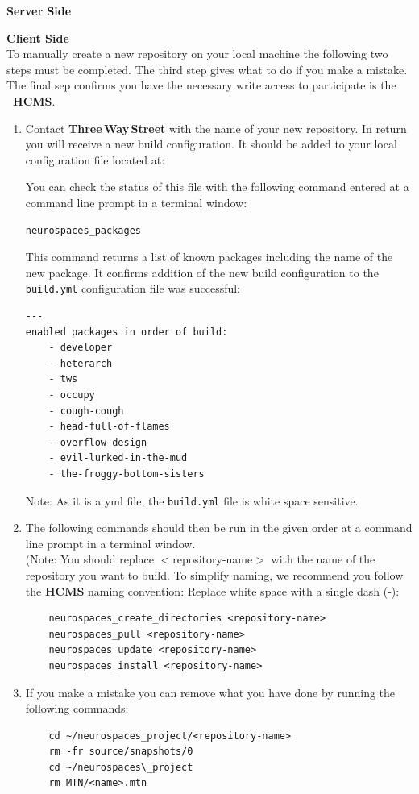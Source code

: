 \documentclass[12pt]{article}
\begin{document}
\begin{description}

\item {\bf Server Side}

\item {\bf Client Side}\\

To manually create a new repository on your local machine the following two steps must be completed. The third step gives what to do if you make a mistake. The final sep confirms you have the necessary write access to participate is the {\bf\ \small HCMS}.

\begin{enumerate}
\item Contact {\bf \small Three\,Way\,Street} with the name of your new repository. In return you will receive a new build configuration. It should be added to your local configuration file located at:\\
  \hspace*{5mm}{\tt /etc/neurospaces/developer/build.yml}
  
You can check the status of this file with the following command entered at a command line prompt in a terminal window:
\begin{verbatim}
neurospaces_packages
\end{verbatim}
This command returns a list of known packages including the name of the new package. It confirms addition of the new build configuration to the {\tt \small build.yml} configuration file was successful:
\begin{verbatim}
---
enabled packages in order of build:
    - developer
    - heterarch
    - tws
    - occupy
    - cough-cough
    - head-full-of-flames
    - overflow-design
    - evil-lurked-in-the-mud
    - the-froggy-bottom-sisters
\end{verbatim}
Note: As it is a yml file, the {\tt \small build.yml} file is white space sensitive.

\item The following commands should then be run in the given order at a command line prompt  in a terminal window.\\
(Note: You should replace $<$repository-name$>$ with the name of the repository you want to build. To simplify naming, we recommend you follow the {\bf \small HCMS} naming convention: Replace white space with a single dash (-):
\begin{verbatim}
	neurospaces_create_directories <repository-name>
	neurospaces_pull <repository-name>
	neurospaces_update <repository-name>
	neurospaces_install <repository-name>
\end{verbatim}
\item If you make a mistake you can remove what you have done by running the following commands:
\begin{verbatim}
	cd ~/neurospaces_project/<repository-name>
	rm -fr source/snapshots/0
	cd ~/neurospaces\_project
	rm MTN/<name>.mtn
\end{verbatim}


\end{enumerate}
\end{description}
\end{document}
